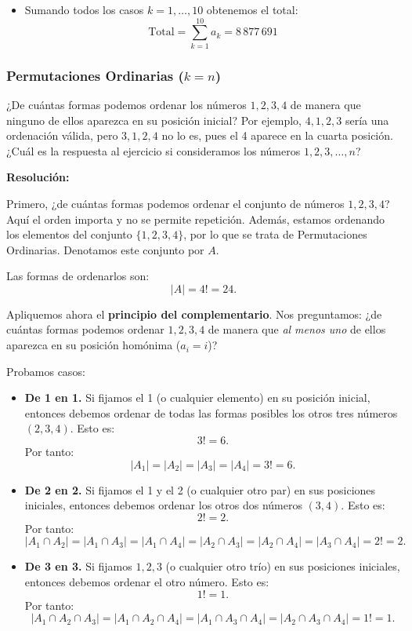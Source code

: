 \documentclass[a4paper,12pt]{article}
\begin{document}
\begin{ejercicio}[title=Ejercicio 46 (⋆)]
\begin{itemize}
\item Sumando todos los casos \(k=1,\dots,10\) obtenemos el total:
\[
\text{Total} = \sum_{k=1}^{10} a_k = \boxed{8\,877\,691}
\]

\end{itemize}

\end{ejercicio}

\subsubsection{Permutaciones Ordinarias ($k=n$)}

\begin{ejercicio}[title=Ejercicio 14 (⋆)]
¿De cuántas formas podemos ordenar los números $1,2,3,4$ de manera que ninguno de ellos aparezca en su posición inicial? Por ejemplo, $4,1,2,3$ sería una ordenación válida, pero $3,1,2,4$ no lo es, pues el 4 aparece en la cuarta posición. ¿Cuál es la respuesta al ejercicio si consideramos los números $1,2,3,\dots,n$?

\tcblower
\textbf{Resolución:}

Primero, ¿de cuántas formas podemos ordenar el conjunto de números $1,2,3,4$?  
Aquí el orden importa y no se permite repetición. Además, estamos ordenando los elementos del conjunto $\{1,2,3,4\}$, por lo que se trata de Permutaciones Ordinarias. Denotamos este conjunto por $A$.

Las formas de ordenarlos son:
\[
|A| = 4! = 24.
\]

Apliquemos ahora el \textbf{principio del complementario}. Nos preguntamos:  
¿de cuántas formas podemos ordenar $1,2,3,4$ de manera que \emph{al menos uno} de ellos aparezca en su posición homónima ($a_i = i$)?

Probamos casos:

\begin{itemize}
    \item \textbf{De 1 en 1.}  
    Si fijamos el 1 (o cualquier elemento) en su posición inicial, entonces debemos ordenar de todas las formas posibles los otros tres números $(2,3,4)$. Esto es:
    \[
    3! = 6.
    \]
    Por tanto:
    \[
    |A_1| = |A_2| = |A_3| = |A_4| = 3! = 6.
    \]

    \item \textbf{De 2 en 2.}  
    Si fijamos el 1 y el 2 (o cualquier otro par) en sus posiciones iniciales, entonces debemos ordenar los otros dos números $(3,4)$. Esto es:
    \[
    2! = 2.
    \]
    Por tanto:
    \[
    |A_1 \cap A_2| = |A_1 \cap A_3| = |A_1 \cap A_4| = |A_2 \cap A_3| = |A_2 \cap A_4| = |A_3 \cap A_4| = 2! = 2.
    \]

    \item \textbf{De 3 en 3.}  
    Si fijamos $1,2,3$ (o cualquier otro trío) en sus posiciones iniciales, entonces debemos ordenar el otro número. Esto es:
    \[
    1! = 1.
    \]
    Por tanto:
    \[
    |A_1 \cap A_2 \cap A_3| = |A_1 \cap A_2 \cap A_4| = |A_1 \cap A_3 \cap A_4|
    = |A_2 \cap A_3 \cap A_4| = 1! = 1.
    \]

    \end{itemize}
    \end{ejercicio}
\end{document}
